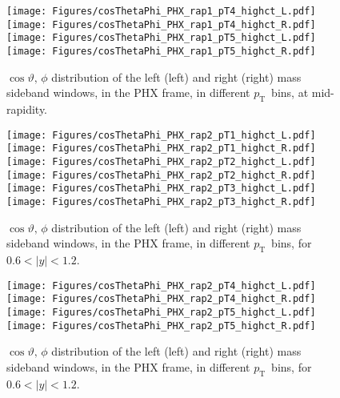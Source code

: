 \documentclass[12pt]{article}
\newcommand{\pt}{$p_{\mathrm{T}}$}
\begin{document}
\begin{figure}[htbp]
\centering
\texttt{[image: Figures/cosThetaPhi\_PHX\_rap1\_pT4\_highct\_L.pdf]}
\texttt{[image: Figures/cosThetaPhi\_PHX\_rap1\_pT4\_highct\_R.pdf]}
\texttt{[image: Figures/cosThetaPhi\_PHX\_rap1\_pT5\_highct\_L.pdf]}
\texttt{[image: Figures/cosThetaPhi\_PHX\_rap1\_pT5\_highct\_R.pdf]}
\caption{$\cos\vartheta,\,\phi$ distribution of the left (left) and
  right (right) mass sideband windows, in the PHX frame, in different
  \pt\ bins, at mid-rapidity.} 
\end{figure}
\clearpage


\begin{figure}[htbp]
\centering
\texttt{[image: Figures/cosThetaPhi\_PHX\_rap2\_pT1\_highct\_L.pdf]}
\texttt{[image: Figures/cosThetaPhi\_PHX\_rap2\_pT1\_highct\_R.pdf]}
\texttt{[image: Figures/cosThetaPhi\_PHX\_rap2\_pT2\_highct\_L.pdf]}
\texttt{[image: Figures/cosThetaPhi\_PHX\_rap2\_pT2\_highct\_R.pdf]}
\texttt{[image: Figures/cosThetaPhi\_PHX\_rap2\_pT3\_highct\_L.pdf]}
\texttt{[image: Figures/cosThetaPhi\_PHX\_rap2\_pT3\_highct\_R.pdf]}
\caption{$\cos\vartheta,\,\phi$ distribution of the left (left) and
  right (right) mass sideband windows, in the PHX frame, in different
  \pt\ bins, for $0.6 < |y| < 1.2$.}
\end{figure}
\clearpage

\begin{figure}[htbp]
\centering
\texttt{[image: Figures/cosThetaPhi\_PHX\_rap2\_pT4\_highct\_L.pdf]}
\texttt{[image: Figures/cosThetaPhi\_PHX\_rap2\_pT4\_highct\_R.pdf]}
\texttt{[image: Figures/cosThetaPhi\_PHX\_rap2\_pT5\_highct\_L.pdf]}
\texttt{[image: Figures/cosThetaPhi\_PHX\_rap2\_pT5\_highct\_R.pdf]}
\caption{$\cos\vartheta,\,\phi$ distribution of the left (left) and
  right (right) mass sideband windows, in the PHX frame, in different
  \pt\ bins, for $0.6 < |y| < 1.2$.} 
\end{figure}
\clearpage
\end{document}
